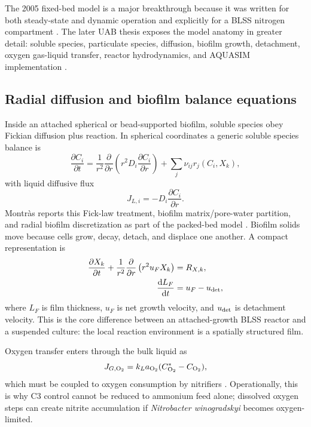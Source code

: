 \documentclass[11pt]{article}
\newcommand{\Ntb}{\textit{Nitrobacter winogradskyi}}
\newcommand{\dd}{\mathrm{d}}
\begin{document}
The 2005 fixed-bed model is a major breakthrough because it was written for both steady-state and dynamic operation and explicitly for a BLSS nitrogen compartment \parencite[2359--2369]{perez2005}. The later UAB thesis exposes the model anatomy in greater detail: soluble species, particulate species, diffusion, biofilm growth, detachment, oxygen gas-liquid transfer, reactor hydrodynamics, and AQUASIM implementation \parencite[96--115]{montras2009}.

\subsection{Radial diffusion and biofilm balance equations}

Inside an attached spherical or bead-supported biofilm, soluble species obey Fickian diffusion plus reaction. In spherical coordinates a generic soluble species balance is
\begin{equation}
  \frac{\partial C_i}{\partial t}
  =\frac{1}{r^2}\frac{\partial}{\partial r}\left(r^2D_i\frac{\partial C_i}{\partial r}\right)
   +\sum_j \nu_{ij}r_j(C_i,X_k),
  \label{eq:spherical_diffusion}
\end{equation}
with liquid diffusive flux
\begin{equation}
  J_{L,i}=-D_i\frac{\partial C_i}{\partial r}.
  \label{eq:fick_biofilm}
\end{equation}
Montr\`as reports this Fick-law treatment, biofilm matrix/pore-water partition, and radial biofilm discretization as part of the packed-bed model \parencite[96--97, 114--115]{montras2009}. Biofilm solids move because cells grow, decay, detach, and displace one another. A compact representation is
\begin{align}
  \frac{\partial X_k}{\partial t}+\frac{1}{r^2}\frac{\partial}{\partial r}\left(r^2u_FX_k\right)&=R_{X,k},\label{eq:solids_balance}\\
  \frac{\dd L_F}{\dd t}&=u_F-u_{\rm det},\label{eq:biofilm_thickness}
\end{align}
where $L_F$ is film thickness, $u_F$ is net growth velocity, and $u_{\rm det}$ is detachment velocity. This is the core difference between an attached-growth BLSS reactor and a suspended culture: the local reaction environment is a spatially structured film.

Oxygen transfer enters through the bulk liquid as
\begin{equation}
  J_{G,\ce{O2}}=k_La_{\ce{O2}}(C^*_{\ce{O2}}-C_{\ce{O2}}),
  \label{eq:oxygen_transfer_c3}
\end{equation}
which must be coupled to oxygen consumption by nitrifiers \parencite[97--98]{montras2009}. Operationally, this is why C3 control cannot be reduced to ammonium feed alone; dissolved oxygen steps can create nitrite accumulation if \Ntb{} becomes oxygen-limited.
\end{document}
